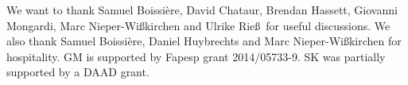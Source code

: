 \documentclass{alggeom}
\begin{document}

%
%



%



\appendix

\begin{acknowledgements}
We want to thank Samuel Boissi\`ere, David Chataur, Brendan Hassett, Giovanni Mongardi, Marc Nieper-Wi\ss kirchen and Ulrike Rie\ss\ for useful discussions.
We also thank Samuel Boissi\`ere, Daniel Huybrechts and Marc Nieper-Wi\ss kirchen for hospitality.
GM is supported by Fapesp grant 2014/05733-9. SK was partially supported by a DAAD grant.
\end{acknowledgements}

\end{document}
